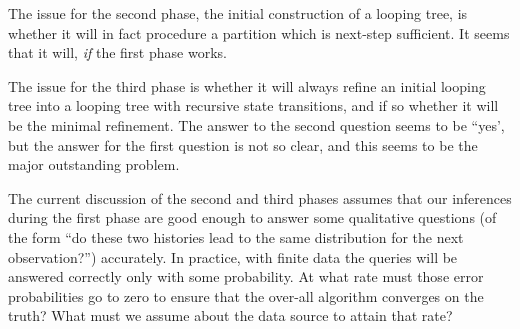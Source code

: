 \documentclass[../new-procedure.tex]{subfiles}
\begin{document}
The issue for the second phase, the initial construction of a looping tree, is
whether it will in fact procedure a partition which is next-step sufficient.
It seems that it will, {\em if} the first phase works.

The issue for the third phase is whether it will always refine an initial
looping tree into a looping tree with recursive state transitions, and if so
whether it will be the minimal refinement. The answer to the second question
seems to be ``yes', but the answer for the first question is not so clear, and
this seems to be the major outstanding problem.

The current discussion of the second and third phases assumes that our
inferences during the first phase are good enough to answer some qualitative
questions (of the form ``do these two histories lead to the same distribution
for the next observation?'') accurately. In practice, with finite data the
queries will be answered correctly only with some probability. At what rate
must those error probabilities go to zero to ensure that the over-all algorithm
converges on the truth?  What must we assume about the data source to attain
that rate?
\end{document}
